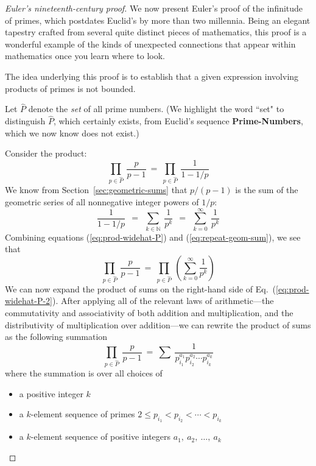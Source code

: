 \begin{proof} [Euler's nineteenth-century proof]
We now present Euler's proof of the infinitude of primes, which postdates Euclid's by more than two millennia.  Being an elegant tapestry crafted from several quite distinct pieces of mathematics, this proof is a wonderful example of the kinds of unexpected connections that appear within mathematics once you learn where to look.

\medskip

The idea underlying this proof is to establish that a given expression involving products of primes is not bounded.

\smallskip

Let $\widehat{P}$ denote the {\em set} of all prime numbers.  (We highlight the word ``set" to distinguish $\widehat{P}$, which certainly exists, from Euclid's sequence {\bf Prime-Numbers}, which we now know does not exist.)

\smallskip

Consider the product:
\begin{equation}
\label{eq:prod-widehat-P}
 \prod_{p \in \widehat{P}} \ \frac{p}{p-1} \ = \ \prod_{p \in \widehat{P}} \ \frac{1}{1-1/p} 
\end{equation}
We know from Section~\ref{sec:geometric-sums} that $p/(p-1)$ is the sum of the geometric series of all nonnegative integer powers of $1/p$: 
\begin{equation}
\label{eq:repeat-geom-sum}
\frac{1}{1-1/p} \ \ = \ \
\sum_{k \in {\mathbb{N}}} \  \frac{1}{p^k} \ \ = \ \
\sum_{k=0}^{\infty} \  \frac{1}{p^k} 
\end{equation}
Combining equations (\ref{eq:prod-widehat-P}) and (\ref{eq:repeat-geom-sum}), we see that
\begin{equation}
\label{eq:prod-widehat-P-2}
\prod_{p \in \widehat{P}} \ \frac{p}{p-1} \ = \
 \prod_{p \in \widehat{P}} \ \left( \sum_{k=0}^{\infty} \frac{1}{p^k} \right)
\end{equation}
We can now expand the product of sums on the right-hand side of 
Eq.~(\ref{eq:prod-widehat-P-2}).  After applying all of the relevant laws of arithmetic---the commutativity and associativity of both addition and multiplication, and the distributivity of multiplication over addition---we can rewrite the product of sums as the following summation
\begin{equation}
\label{eq:prod-widehat-P-3}
 \prod_{p \in \widehat{P}} \ \frac{p}{p-1} \ = \
\sum \ \frac{1}{p_{i_1}^{a_1} p_{i_2}^{a_2} \cdots p_{i_k}^{a_k}}
\end{equation}
where the summation is over all choices of
\begin{itemize}
\item
a positive integer $k$
\item
a $k$-element sequence of primes $2 \leq p_{i_1} < p_{i_2} < \cdots < p_{i_k}$
\item
a $k$-element sequence of positive integers $a_1, \ a_2, \ \ldots,  \ a_k$
\end{itemize}


\end{proof}

